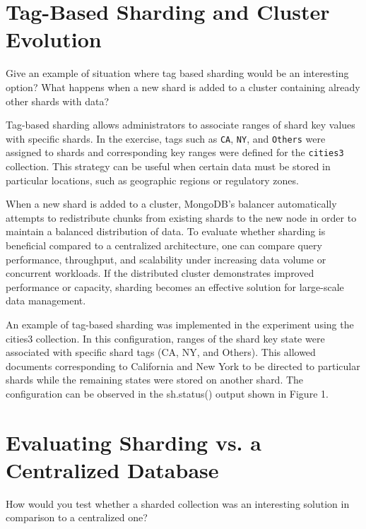 \documentclass[11pt]{article}
\begin{document}
\section*{Tag-Based Sharding and Cluster Evolution}

Give an example of situation where tag based sharding would be an interesting option?  
What happens when a new shard is added to a cluster containing already other shards 
with data? 

\begin{tcolorbox}

Tag-based sharding allows administrators to associate ranges of shard key values with specific shards. In the exercise, tags such as \texttt{CA}, \texttt{NY}, and \texttt{Others} were assigned to shards and corresponding key ranges were defined for the \texttt{cities3} collection. This strategy can be useful when certain data must be stored in particular locations, such as geographic regions or regulatory zones.

When a new shard is added to a cluster, MongoDB's balancer automatically attempts to redistribute chunks from existing shards to the new node in order to maintain a balanced distribution of data. To evaluate whether sharding is beneficial compared to a centralized architecture, one can compare query performance, throughput, and scalability under increasing data volume or concurrent workloads. If the distributed cluster demonstrates improved performance or capacity, sharding becomes an effective solution for large-scale data management.

\end{tcolorbox}

An example of tag-based sharding was implemented in the experiment using the cities3 collection. In this configuration, ranges of the shard key state were associated with specific shard tags (CA, NY, and Others). This allowed documents corresponding to California and New York to be directed to particular shards while the remaining states were stored on another shard. The configuration can be observed in the sh.status() output shown in Figure 1.

\section*{Evaluating Sharding vs. a Centralized Database}

How would you test whether a sharded collection was an interesting solution in comparison to a centralized one?
\end{document}
